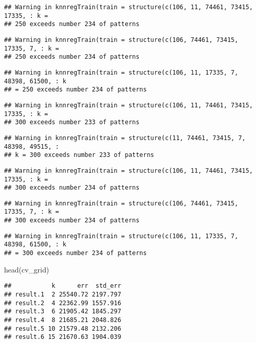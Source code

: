 \documentclass[
]{article}
\newenvironment{Shaded}{\begin{snugshade}}{\end{snugshade}}
\newcommand{\FunctionTok}[1]{\textcolor[rgb]{0.00,0.00,0.00}{#1}}
\newcommand{\NormalTok}[1]{#1}
\begin{document}
\begin{verbatim}
## Warning in knnregTrain(train = structure(c(106, 11, 74461, 73415, 17335, : k =
## 250 exceeds number 234 of patterns
\end{verbatim}

\begin{verbatim}
## Warning in knnregTrain(train = structure(c(106, 74461, 73415, 17335, 7, : k =
## 250 exceeds number 234 of patterns
\end{verbatim}

\begin{verbatim}
## Warning in knnregTrain(train = structure(c(106, 11, 17335, 7, 48398, 61500, : k
## = 250 exceeds number 234 of patterns
\end{verbatim}

\begin{verbatim}
## Warning in knnregTrain(train = structure(c(106, 11, 74461, 73415, 17335, : k =
## 300 exceeds number 233 of patterns
\end{verbatim}

\begin{verbatim}
## Warning in knnregTrain(train = structure(c(11, 74461, 73415, 7, 48398, 49515, :
## k = 300 exceeds number 233 of patterns
\end{verbatim}

\begin{verbatim}
## Warning in knnregTrain(train = structure(c(106, 11, 74461, 73415, 17335, : k =
## 300 exceeds number 234 of patterns
\end{verbatim}

\begin{verbatim}
## Warning in knnregTrain(train = structure(c(106, 74461, 73415, 17335, 7, : k =
## 300 exceeds number 234 of patterns
\end{verbatim}

\begin{verbatim}
## Warning in knnregTrain(train = structure(c(106, 11, 17335, 7, 48398, 61500, : k
## = 300 exceeds number 234 of patterns
\end{verbatim}

\begin{Shaded}
\begin{Highlighting}[]
\FunctionTok{head}\NormalTok{(cv\_grid)}
\end{Highlighting}
\end{Shaded}

\begin{verbatim}
##           k      err  std_err
## result.1  2 25540.72 2197.797
## result.2  4 22362.99 1557.916
## result.3  6 21905.42 1845.297
## result.4  8 21685.21 2048.826
## result.5 10 21579.48 2132.206
## result.6 15 21670.63 1904.039
\end{verbatim}
\end{document}
